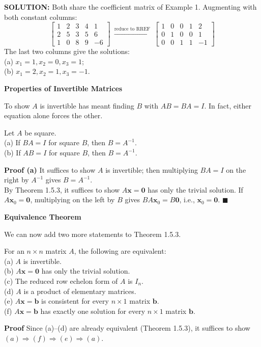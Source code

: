 \documentclass{article}
\newcommand{\redheading}[1]{{\vspace{2mm}\noindent\Large\bfseries\color{red!55!black} #1\par}\vspace{2mm}}
\theoremstyle{mystyle}
\begin{document}
\textbf{SOLUTION:} Both share the coefficient matrix of Example 1. Augmenting with both constant columns:
\[
\left[\begin{array}{ccc|cc}1&2&3&4&1\\2&5&3&5&6\\1&0&8&9&-6\end{array}\right]
\ \xrightarrow{\text{reduce to RREF}}\
\left[\begin{array}{ccc|cc}1&0&0&1&2\\0&1&0&0&1\\0&0&1&1&-1\end{array}\right]
\]
The last two columns give the solutions: \\ (a) $x_1=1,x_2=0,x_3=1$; \\ (b) $x_1=2,x_2=1,x_3=-1$.

\redheading{Properties of Invertible Matrices}

To show $A$ is invertible has meant finding $B$ with $AB=BA=I$. In fact, either equation alone forces the other.

\begin{tcolorbox}[colback=red!4, colframe=red!60!black, title=Theorem 1.6.3, boxrule=0.5mm, arc=3mm]
Let $A$ be square.\\
(a) If $BA=I$ for square $B$, then $B=A^{-1}$.\\
(b) If $AB=I$ for square $B$, then $B=A^{-1}$.
\end{tcolorbox}
\textbf{Proof (a)} It suffices to show $A$ is invertible; then multiplying $BA=I$ on the right by $A^{-1}$ gives $B=A^{-1}$. \\
By Theorem 1.5.3, it suffices to show $A\mathbf{x}=\mathbf{0}$ has only the trivial solution. If $A\mathbf{x}_0=\mathbf{0}$, multiplying on the left by $B$ gives $BA\mathbf{x}_0=B\mathbf{0}$, i.e., $\mathbf{x}_0=\mathbf{0}$. $\blacksquare$

\redheading{Equivalence Theorem}

We can now add two more statements to Theorem 1.5.3.

\begin{tcolorbox}[colback=red!4, colframe=red!60!black, title=Theorem 1.6.4 -- Equivalent Statements, boxrule=0.5mm, arc=3mm]
For an $n\times n$ matrix $A$, the following are equivalent:\\
(a) $A$ is invertible.\\
(b) $A\mathbf{x}=\mathbf{0}$ has only the trivial solution.\\
(c) The reduced row echelon form of $A$ is $I_n$.\\
(d) $A$ is a product of elementary matrices.\\
(e) $A\mathbf{x}=\mathbf{b}$ is consistent for every $n\times1$ matrix $\mathbf{b}$.\\
(f) $A\mathbf{x}=\mathbf{b}$ has exactly one solution for every $n\times1$ matrix $\mathbf{b}$.
\end{tcolorbox}
\textbf{Proof} Since (a)--(d) are already equivalent (Theorem 1.5.3), it suffices to show $(a)\Rightarrow(f)\Rightarrow(e)\Rightarrow(a)$.
\end{document}

